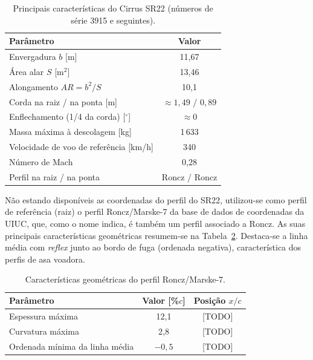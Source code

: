 \begin{table}[H]
  \centering
  \caption{Principais características do Cirrus SR22 (números de série 3915 e
  seguintes).}
  \label{tab:sr22}
  \begin{tabular}{lc}
    \toprule
    Parâmetro & Valor \\
    \midrule
    Envergadura $b$ [m]                         & 11,67 \\
    Área alar $S$ [m$^2$]                       & 13,46 \\
    Alongamento $AR = b^2/S$                    & 10,1 \\
    Corda na raiz / na ponta [m]                & $\approx 1{,}49$ / $0{,}89$ \\
    Enflechamento (1/4 da corda) [$^\circ$]     & $\approx 0$ \\
    Massa máxima à descolagem [kg]              & 1\,633 \\
    Velocidade de voo de referência [km/h]      & 340 \\
    Número de Mach                              & 0,28 \\
    Perfil na raiz / na ponta                   & Roncz / Roncz \\
    \bottomrule
  \end{tabular}
\end{table}

Não estando disponíveis as coordenadas do perfil do SR22, utilizou-se como perfil
de referência (raiz) o perfil Roncz/Marske-7 da base de dados de coordenadas da
UIUC, que, como o nome indica, é também um perfil associado a Roncz. As suas
principais características geométricas resumem-se na Tabela~\ref{tab:perfil}.
Destaca-se a linha média com \emph{reflex} junto ao bordo de fuga (ordenada
negativa), característica dos perfis de asa voadora.
 
\begin{table}[H]
  \centering
  \caption{Características geométricas do perfil Roncz/Marske-7.}
  \label{tab:perfil}
  \begin{tabular}{lcc}
    \toprule
    Parâmetro & Valor [\%$c$] & Posição $x/c$ \\
    \midrule
    Espessura máxima         & 12,1   & {[TODO]} \\
    Curvatura máxima         & 2,8    & {[TODO]} \\
    Ordenada mínima da linha média & $-0{,}5$ & {[TODO]} \\
    \bottomrule
  \end{tabular}
\end{table}

